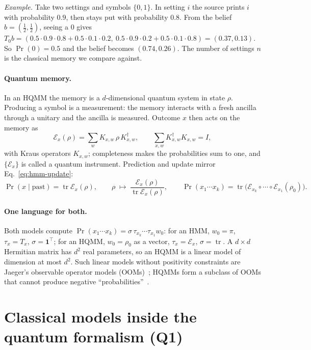 \documentclass[11pt]{article}
\newcommand{\tr}{\operatorname{tr}}
\newcommand{\one}{\mathbf{1}}
\newcommand{\E}{\mathcal{E}}
\begin{document}
\emph{Example.} Take two settings and symbols $\{0,1\}$. In setting $i$ the source prints $i$ with probability $0.9$, then stays put with probability $0.8$. From the belief $b=(\tfrac12,\tfrac12)$, seeing a $0$ gives $T_0 b = (0.5\cdot0.9\cdot0.8 + 0.5\cdot0.1\cdot0.2,\ 0.5\cdot0.9\cdot0.2 + 0.5\cdot0.1\cdot0.8) = (0.37, 0.13)$. So $\Pr(0) = 0.5$ and the belief becomes $(0.74, 0.26)$. The number of settings $n$ is the classical memory we compare against.

\paragraph{Quantum memory.} In an HQMM the memory is a $d$-dimensional quantum system in state $\rho$. Producing a symbol is a measurement: the memory interacts with a fresh ancilla through a unitary and the ancilla is measured. Outcome $x$ then acts on the memory as
\begin{equation}\label{eq:instrument}
  \E_x(\rho) = \sum_{w} K_{x,w}\,\rho\,K_{x,w}^{\dagger}, \qquad \sum_{x,w} K_{x,w}^{\dagger}K_{x,w} = I,
\end{equation}
with Kraus operators $K_{x,w}$; completeness makes the probabilities sum to one, and $\{\E_x\}$ is called a quantum instrument. Prediction and update mirror Eq.~\eqref{eq:hmm-update}:
\begin{equation}\label{eq:hqmm-update}
  \Pr(x\mid\text{past}) = \tr \E_x(\rho), \qquad \rho \;\mapsto\; \frac{\E_x(\rho)}{\tr \E_x(\rho)}, \qquad
  \Pr(x_1\cdots x_k) = \tr\big(\E_{x_k}\circ\cdots\circ\E_{x_1}(\rho_0)\big).
\end{equation}

\paragraph{One language for both.} Both models compute $\Pr(x_1\cdots x_k) = \sigma\,\tau_{x_k}\cdots\tau_{x_1}w_0$: for an HMM, $w_0=\pi$, $\tau_x = T_x$, $\sigma = \one^\top$; for an HQMM, $w_0=\rho_0$ as a vector, $\tau_x = \E_x$, $\sigma=\tr$. A $d\times d$ Hermitian matrix has $d^2$ real parameters, so an HQMM is a linear model of dimension at most $d^2$. Such linear models without positivity constraints are Jaeger's observable operator models (OOMs)~\cite{jaeger2000}; HQMMs form a subclass of OOMs that cannot produce negative ``probabilities''~\cite{adhikary2020}.

\section{Classical models inside the quantum formalism (Q1)}\label{sec:embedding}
\end{document}
